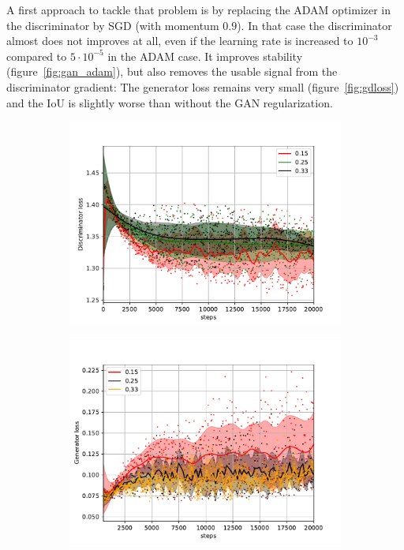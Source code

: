 \documentclass[aps,prl,twocolumn,groupedaddress,amsmath,amssymb]{revtex4-1}
\begin{document}
    A first approach to tackle that problem is by replacing the ADAM optimizer in the discriminator
    by SGD (with momentum $0.9$). In that case the discriminator almost does not improves at all,
    even if the learning rate is increased to $10^{-3}$ compared to $5\cdot10^{-5}$ in the ADAM
    case.  It improves stability (figure~\ref{fig:gan_adam}), but also removes the usable signal
    from the discriminator gradient: The generator loss remains very small (figure~\ref{fig:gdloss})
    and the IoU is slightly worse than without the GAN regularization.

    \begin{figure}[tbp]
        \begin{center}
        \begin{subfigure}[c]{\linewidth}
        \includegraphics[width=\linewidth]{figures/dloss_sgd_adam.pdf}
        \label{Discriminator loss}
        \end{subfigure}
        \begin{subfigure}[c]{\linewidth}
        \includegraphics[width=\linewidth]{figures/gloss_sgd_adam.pdf}

\end{subfigure}
\end{center}
\end{figure}
\end{document}
